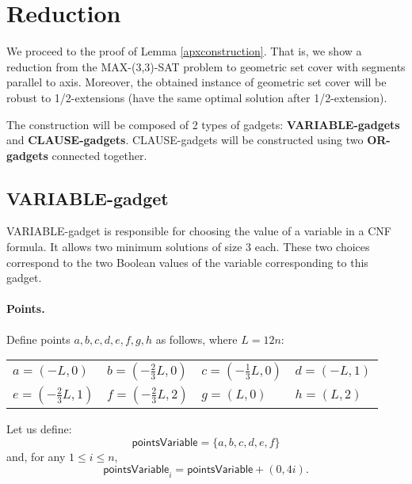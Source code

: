 \section{Reduction}
\label{construction_description}
We proceed to the proof of Lemma \ref{apxconstruction}.
That is, we show a reduction from the MAX-(3,3)-SAT problem
to geometric set cover with segments
parallel to axis. Moreover, the obtained instance
of geometric set cover will be robust
to 1/2-extensions (have the same optimal solution
after 1/2-extension).

The construction will be composed of 2 types of gadgets:
\textbf{VARIABLE-gadgets} and \textbf{CLAUSE-gadgets}.
CLAUSE-gadgets will be constructed using two \textbf{OR-gadgets}
connected together.

\subsection{VARIABLE-gadget}

VARIABLE-gadget is responsible for choosing the value of a variable
in a CNF formula. It allows two minimum solutions of size 3 each.
These two choices correspond to the two Boolean values of the variable
corresponding to this gadget.

\paragraph{Points.}

Define points $a,b,c,d,e,f,g,h$ as follows, where $L = 12n$:


\newcommand{\pointsVarNoArg}{\mathsf{pointsVariable} }
\newcommand{\pointsVar}[1]{\mathsf{pointsVariable}_{#1} }
\newcommand{\chooseVar}[2]{\mathsf{chooseVariable}^{#1}_{#2} }
\newcommand{\segmentsVar}[1]{\mathsf{segmentsVariable}_{#1} }



\begin{center}
\begin{tabular}{ l l l l}
	$a = (-L, 0)$ &
	$b = (-\frac{2}{3}L, 0)$ & 
	$c = (-\frac{1}{3}L, 0)$ & 
	$d = (-L, 1)$ \\  
	$e = (-\frac{2}{3}L, 1)$ & 
	$f = (-\frac{2}{3}L, 2)$ &
	$g = (L, 0)$ &
	$h = (L, 2)$
\end{tabular}
\end{center}


Let us define:
$$\pointsVarNoArg =  \{a, b, c, d, e, f\}$$
and, for any $1 \le i \le n$,
$$\pointsVar{i} = \pointsVarNoArg + (0, 4i).$$

